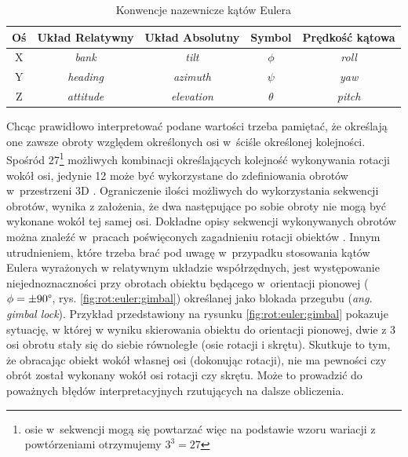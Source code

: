 																											
																											
\begin{table}[!htb]
	\centering
	\caption{Konwencje nazewnicze kątów Eulera}
	\label{tab:appx:rot:eulerNames} 
	\begin{tabular}{|c|c|c|c|c|}
		\hline
		Oś & Układ Relatywny & Układ Absolutny & Symbol   & Prędkość kątowa \\
		\hline
		X   & \emph{bank}      & \emph{tilt}      & $\phi$   & \emph{roll}         \\
		Y   & \emph{heading}   & \emph{azimuth}   & $\psi$ 	 & \emph{yaw}          \\ 
		Z   & \emph{attitude}  & \emph{elevation} & $\theta$ & \emph{pitch}        \\
		\hline
	\end{tabular} 
\end{table}
																													
Chcąc prawidłowo interpretować podane wartości trzeba pamiętać, że określają one zawsze obroty względem określonych osi w~ściśle określonej kolejności. Spośród 27\footnote{osie w~sekwencji mogą się powtarzać więc na podstawie wzoru wariacji z powtórzeniami otrzymujemy $3^3 = 27$} możliwych kombinacji określających kolejność wykonywania rotacji wokół osi, jedynie 12 może być wykorzystane do zdefiniowania obrotów w~przestrzeni 3D \cite{Diebel2006}. Ograniczenie ilości możliwych do wykorzystania sekwencji obrotów, wynika z założenia, że dwa następujące po sobie obroty nie mogą być wykonane wokół tej samej osi. Dokładne opisy sekwencji wykonywanych obrotów można znaleźć w~pracach poświęconych zagadnieniu rotacji obiektów \cite{Pio1966, Diebel2006}. Innym utrudnieniem, które trzeba brać pod uwagę w~przypadku stosowania kątów Eulera wyrażonych w relatywnym układzie współrzędnych, jest występowanie niejednoznaczności przy obrotach obiektu będącego w~orientacji pionowej ($\phi=\pm90\degree$, rys. \ref{fig:rot:euler:gimbal}) określanej jako blokada przegubu (\emph{ang. gimbal lock}). Przykład przedstawiony na rysunku \ref{fig:rot:euler:gimbal} pokazuje sytuację, w której w wyniku skierowania obiektu do orientacji pionowej, dwie z 3 osi obrotu stały się do siebie równoległe (osie rotacji i skrętu). Skutkuje to tym, że obracając obiekt wokół własnej osi (dokonując rotacji), nie ma pewności czy obrót został wykonany wokół osi rotacji czy skrętu. Może to prowadzić do poważnych błędów interpretacyjnych rzutujących na dalsze obliczenia.

